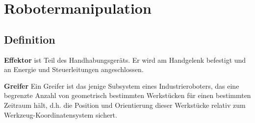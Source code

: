 \section{Robotermanipulation}
\subsection{Definition}
\begin{minipage}[t]{0.5\linewidth}
    \textbf{Effektor}\newline
    ist Teil des Handhabungsgeräts. Er wird am Handgelenk befestigt und an Energie und Steuerleitungen angeschlossen.
\end{minipage}
\begin{minipage}[t]{0.5\linewidth}
    \textbf{Greifer}\newline
    Ein Greifer ist das jenige Subsystem eines Industrieroboters, das eine 
    begrenzte Anzahl von geometrisch bestimmten Werkstücken für einen 
    bestimmten Zeitraum hält, d.h. die Position und Orientierung dieser 
    Werkstücke relativ zum Werkzeug-Koordinatensystem sichert.
\end{minipage}
